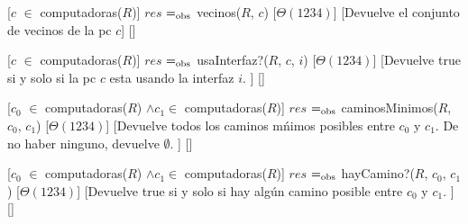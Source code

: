 \begin{Interfaz}
  [$c$ $\in$ computadoras($R$)]%
  {$res$ $=_{\mathrm{obs}}$ vecinos($R$, $c$)}%
  [$\Theta(1234)$]%
  [Devuelve el conjunto de vecinos de la pc $c$]%
  []%
  
  [$c$ $\in$ computadoras($R$)]%
  {$res$ $=_{\mathrm{obs}}$ usaInterfaz?($R$, $c$, $i$)}%
  [$\Theta(1234)$]%
  [Devuelve true si y solo si la pc $c$ esta usando la interfaz $i$. ]%
  []%
  
  [$c_{0}$ $\in$ computadoras($R$) $\land c_{1} \in $ computadoras($R$)]%
  {$res$ $=_{\mathrm{obs}}$ caminosMinimos($R$, $c_{0}$, $c_{1}$)}%
  [$\Theta(1234)$]%
  [Devuelve todos los caminos m\'nimos posibles entre $c_{0}$ y $c_{1}$. De no haber ninguno, devuelve $\emptyset$. ]%
  []%
  
  [$c_{0}$ $\in$ computadoras($R$) $\land c_{1} \in $ computadoras($R$)]%
  {$res$ $=_{\mathrm{obs}}$ hayCamino?($R$, $c_{0}$, $c_{1}$)}%
  [$\Theta(1234)$]%
  [Devuelve true si y solo si hay alg\'un camino posible entre $c_{0}$ y $c_{1}$. ]%
  []%

\end{Interfaz}

